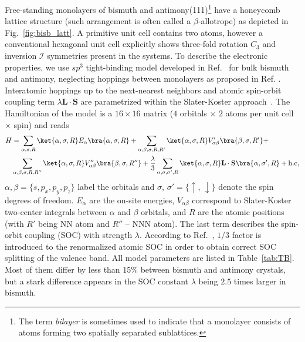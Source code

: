 Free-standing monolayers of bismuth and antimony(111)\footnote{The term \emph{bilayer} is sometimes used to indicate that a monolayer consists of atoms forming two spatially separated sublattices.} have a honeycomb lattice structure (such arrangement is often called a $\beta$-allotrope) as depicted in Fig.~\ref{fig:bisb_latt}. A primitive unit cell contains two atoms, however a conventional hexagonal unit cell explicitly shows three-fold rotation $C_3$ and inversion $\mathcal{I}$ symmetries present in the systems. To describe the electronic properties, we use $sp^3$ tight-binding model developed in Ref.~\cite{Liu:Allen} for bulk bismuth and antimony, neglecting hoppings between monolayers as proposed in Ref. \cite{Murakami:BiQSH}. Interatomic hoppings up to the next-nearest neighbors and atomic spin-orbit coupling term $\lambda \mathbf{L}\cdot\mathbf{S}$ are parametrized within the Slater-Koster approach~\cite{Slater:Koster}. The Hamiltonian of the model is a $16 \times 16$ matrix ($4$ orbitals $\times$ $2$ atoms per unit cell $\times$ spin) and reads
\begin{equation}
\begin{aligned}
H &= \sum_{\alpha, \sigma, R} \ket{\alpha ,\sigma ,R}  E_\alpha   \bra{\alpha ,\sigma ,R}  + \sum_{\alpha ,\beta ,\sigma ,R, R'}  \ket{\alpha ,\sigma ,R}  V_{\alpha \beta }'   \bra{\beta ,\sigma ,R'} +  \\
&\sum_{\alpha ,\beta ,\sigma ,R,R''} \ket{\alpha ,\sigma ,R}  V_{\alpha \beta} ''     \bra{\beta ,\sigma ,R''} +  \frac{\lambda}{3} \sum_{\alpha ,\sigma ,\sigma ',R} \ket{\alpha ,\sigma ,R} \mathbf{L} \cdot \mathbf{S}  \bra{\alpha ,\sigma ',R}  + \mathrm{h. c}, 
\end{aligned}
\label{eq:liu allen}
\end{equation}
$\alpha, \beta = \lbrace s, p_x, p_y, p_z \rbrace$ label the orbitals and $\sigma, \, \sigma ' = \lbrace \uparrow, \, \downarrow \rbrace $ denote the spin degrees of freedom. $E_{\alpha}$ are the on-site energies, $V_{\alpha \beta}$ correspond to Slater-Koster two-center integrals between ${\alpha}$ and ${\beta}$ orbitals, and $R$ are the atomic positions (with $R'$ being NN atom and $R''$ -- NNN atom). The last term describes the spin-orbit coupling (SOC) with strength $\lambda$. According to Ref.~\cite{Chadi}, $1/3$ factor is introduced to the renormalized atomic SOC in order to obtain correct SOC splitting of the valence band. All model parameters are listed in Table~\ref{tab:TB}. Most of them differ by less than $15\%$ between bismuth and antimony crystals, but a stark difference appears in the SOC constant $\lambda$ being $2.5$ times larger in bismuth.

